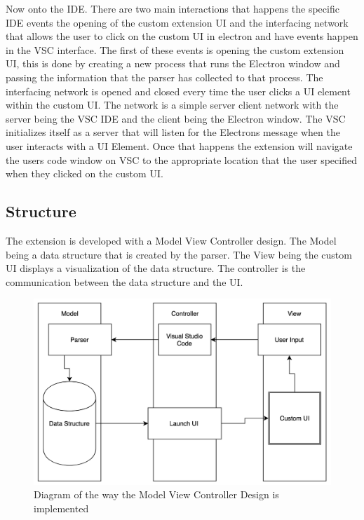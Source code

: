 \documentclass[letterpaper,10pt,titlepage,draftclsnofoot,onecolumn,onesided] {IEEEtran}
\begin{document}
Now onto the IDE. 
There are two main interactions that happens the specific IDE events the opening of the custom extension UI and the interfacing network that allows the user to click on the custom UI in electron and have events happen in the VSC interface. 
The first of these events is opening the custom extension UI, this is done by creating a new process that runs the Electron window and passing the information that the parser has collected to that process.  
The interfacing network is opened and closed every time the user clicks a UI element within the custom UI. 
The network is a simple server client network with the server being the VSC IDE and the client being the Electron window. 
The VSC initializes itself as a server that will listen for the Electrons message when the user interacts with a UI Element. 
Once that happens the extension will navigate the users code window on VSC to the appropriate location that the user specified when they clicked on the custom UI.  \\

\subsection{Structure}

The extension is developed with a Model View Controller design.
The Model being a data structure that is created by the parser. 
The View being the custom UI displays a visualization of the data structure.
The controller is the communication between the data structure and the UI.

\begin{figure}[H]
	\centering
	\includegraphics[width=.75\textwidth]{MVCsimple}
	\caption{Diagram of the way the Model View Controller Design is implemented}
\end{figure}

\end{document}
